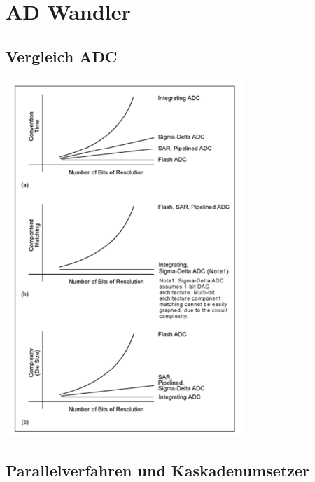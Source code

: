 \section{AD Wandler }

\subsection{Vergleich ADC}
\includegraphics[width=9cm, valign=t]{pictures/vergleich_ADC.png}

\newpage

\subsection{Parallelverfahren und Kaskadenumsetzer}

